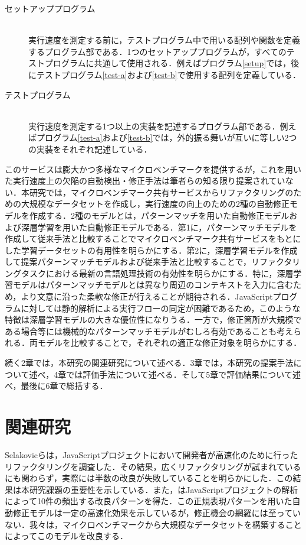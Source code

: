 \documentclass[T,J]{fose} %
\begin{document}
\begin{description}

\item[セットアッププログラム]\mbox{}\\
実行速度を測定する前に，テストプログラム中で用いる配列や関数を定義するプログラム部である．1つのセットアッププログラムが，すべてのテストプログラムに共通して使用される．例えばプログラム\ref{setup}では，後にテストプログラム\ref{test-a}および\ref{test-b}で使用する配列を定義している．

\item[テストプログラム]\mbox{}\\
実行速度を測定する1つ以上の実装を記述するプログラム部である．例えばプログラム\ref{test-a}および\ref{test-b}では，外的振る舞いが互いに等しい2つの実装をそれぞれ記述している．

\end{description}


このサービスは膨大かつ多様なマイクロベンチマークを提供するが，これを用いた実行速度上の欠陥の自動検出・修正手法は筆者らの知る限り提案されていない．本研究では，マイクロベンチマーク共有サービスからリファクタリングのための大規模なデータセットを作成し，実行速度の向上のための2種の自動修正モデルを作成する．2種のモデルとは，パターンマッチを用いた自動修正モデルおよび深層学習を用いた自動修正モデルである．第1に，パターンマッチモデルを作成して従来手法と比較することでマイクロベンチマーク共有サービスをもとにした学習データセットの有用性を明らかにする．第2に，深層学習モデルを作成して提案パターンマッチモデルおよび従来手法と比較することで，リファクタリングタスクにおける最新の言語処理技術の有効性を明らかにする．特に，深層学習モデルはパターンマッチモデルとは異なり周辺のコンテキストを入力に含むため，より文意に沿った柔軟な修正が行えることが期待される．JavaScriptプログラムに対しては静的解析による実行フローの同定が困難であるため，このような特徴は深層学習モデルの大きな優位性になりうる．一方で，修正箇所が大規模である場合等には機械的なパターンマッチモデルがむしろ有効であることも考えられる．両モデルを比較することで，それぞれの適正な修正対象を明らかにする．

続く2章では，本研究の関連研究について述べる．3章では，本研究の提案手法について述べ，4章では評価手法について述べる．そして5章で評価結果について述べ，最後に6章で総括する．


\section{関連研究}\label{sec:related}
Selakovicら\cite{Selakovic_2016}は，JavaScriptプロジェクトにおいて開発者が高速化のために行ったリファクタリングを調査した．その結果，広くリファクタリングが試まれているにも関わらず，実際には半数の改良が失敗していることを明らかにした．この結果は本研究課題の重要性を示している．また，\cite{Selakovic_2016}はJavaScriptプロジェクトの解析によって10件の頻出する改良パターンを得た．この正規表現パターンを用いた自動修正モデルは一定の高速化効果を示しているが，修正機会の網羅には至っていない．我々は，マイクロベンチマークから大規模なデータセットを構築することによってこのモデルを改良する．
\end{document}
